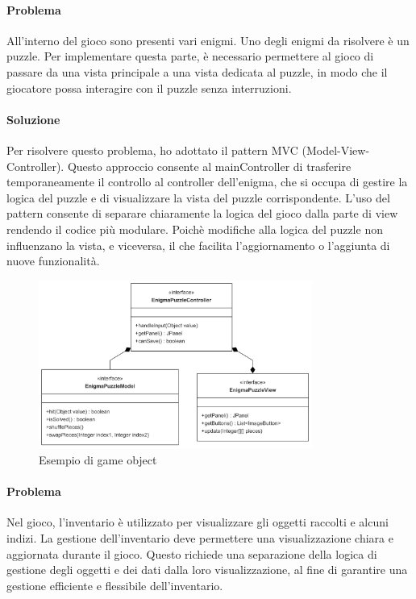 \documentclass[a4paper,12pt]{report}
\begin{document}
\paragraph{Problema}All’interno del gioco sono presenti vari enigmi. Uno degli enigmi da risolvere è un puzzle. 
Per implementare questa parte, è necessario permettere al gioco di passare da una vista principale a una vista dedicata al puzzle, in modo che il giocatore possa interagire con il puzzle senza interruzioni. 
%
\paragraph{Soluzione}Per risolvere questo problema, ho adottato il pattern MVC (Model-View-Controller). 
Questo approccio consente al mainController di trasferire temporaneamente il controllo al controller dell’enigma, che si occupa di gestire la logica del puzzle e di visualizzare la vista del puzzle corrispondente. 
L’uso del pattern consente di separare chiaramente la logica del gioco dalla parte di view rendendo il codice più modulare. 
Poichè modifiche alla logica del puzzle non influenzano la vista, e viceversa, il che facilita l'aggiornamento o l'aggiunta di nuove funzionalità.
\begin{figure}[h]  %
    \centering
    \includegraphics[width=0.8\textwidth]{img/puzzle.png}  %
    \caption{Esempio di game object}
    \label{img:gameObject}
\end{figure}
%
\paragraph{Problema}Nel gioco, l'inventario è utilizzato per visualizzare gli oggetti raccolti e alcuni indizi. La gestione dell'inventario deve permettere una visualizzazione chiara e aggiornata durante il gioco. Questo richiede una separazione della logica di gestione degli oggetti e dei dati dalla loro visualizzazione, al fine di garantire una gestione efficiente e flessibile dell'inventario.
%
\end{document}
